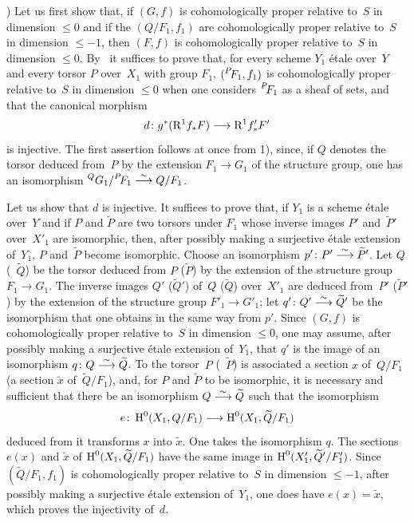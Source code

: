 ) Let us first show that, if $(G,f)$ is cohomologically
proper relative to~$S$ in dimension $\leqslant 0$ and if the
$(Q/F_1, f_1)$ are cohomologically
proper relative to~$S$ in dimension $\leqslant -1$, then
$(F,f)$ is cohomologically proper relative to~$S$ in
dimension $\leqslant 0$. By~ it suffices to
prove that, for every scheme $Y_1$ \'etale over~$Y$ and
every torsor $P$ over~$X_1$ with group $F_1$, $(\leftexp{P\mkern-4mu}{F}_1,
f_1)$ is cohomologically proper relative to~$S$ in dimension
$\leqslant 0$ when one considers $\leftexp{P\mkern-4mu}{F}_1$ as a
sheaf of sets, and that the canonical morphism
$$
d \colon g^*(\R^1 f_* F) \to \R^1 f'_* F'
$$
is injective. The first assertion follows at once from 1),
since, if $Q$ denotes the torsor deduced from~$P$ by the extension
$F_1 \to G_1$ of the structure group, one has an isomorphism
$\leftexp{Q}{G}_1 / \leftexp{P\mkern-4mu}{F}_1 \isomto Q/F_1$.

Let us show that $d$ is injective. It suffices to prove that, if $Y_1$ is
a scheme \'etale over~$Y$ and if $P$ and $\tilde{P}$ are
two torsors under $F_1$ whose inverse images $P'$ and~$\tilde{P}'$
over~$X'_1$ are isomorphic, then, after possibly making a surjective
\'etale extension of~$Y_1$, $P$ and~$\tilde{P}$ become
isomorphic. Choose an isomorphism $p' \colon P' \overset{\sim}{\longrightarrow}
\widetilde{P}'$. Let $Q$ (\resp~$\tilde{Q}$) be the torsor deduced from
$P$ (\resp $\tilde{P}$) by the extension of the structure group $F_1 \to
G_1$. The inverse images $Q'$ (\resp $\tilde{Q}'$) of~$Q$
(\resp $\tilde{Q}$) over~$X'_1$ are deduced from~$P'$
(\resp $\tilde{P}'$) by
the extension
of the structure group $F'_1 \to G'_1$; let $q' \colon Q' \overset{\sim}{\longrightarrow}
\widetilde{Q}'$ be the isomorphism that one obtains in the same way from
$p'$. Since $(G,f)$ is cohomologically proper relative to~$S$ in dimension $\leqslant 0$, one may assume, after possibly making
a surjective \'etale extension of~$Y_1$, that $q'$ is the image of an
isomorphism $q \colon Q \overset{\sim}{\longrightarrow} \widetilde{Q}$. To the torsor~$P$
(\resp~$\tilde{P}$) is associated a section $x$ of~$Q/F_1$
(\resp a section $\tilde{x}$ of~$\tilde{Q}/F_1$), and, for $P$
and $\tilde{P}$ to be isomorphic, it is necessary and sufficient that there be an
isomorphism $Q \overset{\sim}{\longrightarrow} \widetilde{Q}$ such that the isomorphism
$$
e \colon \H^0(X_1, Q/F_1) \to \H^0(X_1,\tilde{Q}/F_1)
$$
deduced from it transforms $x$ into $\tilde{x}$. One takes
the isomorphism $q$. The sections $e(x)$ and $\tilde{x}$ of
$\operatorname{H}^0(X_1,\widetilde{Q}/F_1)$ have the same image in
$\operatorname{H}^0(X'_1,\widetilde{Q}'/F'_1)$. Since $(\tilde{Q}/F_1,f_1)$ is
cohomologically proper relative to~$S$ in dimension
$\leqslant -1$,
after possibly making a surjective \'etale extension of~$Y_1$, one does
have $e(x) = \tilde{x}$, which proves the injectivity of~$d$.

